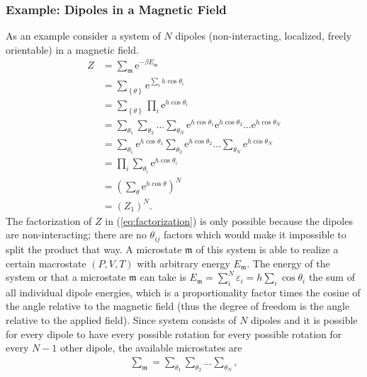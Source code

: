 \documentclass[a4paper,10pt]{article}
\numberwithin{equation}{section}
\begin{document}
\begin{multicols}{2}
\subsubsection{Example: Dipoles in a Magnetic Field}
As an example consider a system of $N$ dipoles (non-interacting, localized, freely orientable) in a magnetic field.
\begin{align} 
          Z &= \sum_{\mathfrak{m}}^{}\text{e}^{-\beta E_\mathfrak{m}}\\
            &= \sum_{ \left\{\theta \right\}}^{}\text{e}^{\sum_{i}^{}h\cos \theta _i}\\
            &= \sum_{ \left\{\theta \right\}}^{}\prod_{i}^{}\text{e}^{h\cos \theta _i}\\
            &= \sum_{\theta _1}^{}\sum_{\theta _2}^{}\hdots \sum_{\theta _N}^{}\text{e}^{h\cos \theta _1}\text{e}^{h\cos \theta _2}\hdots \text{e}^{h\cos \theta _N}\\
            &= \sum_{\theta _1}^{}\text{e}^{h\cos \theta _1}\sum_{\theta _2}^{}\text{e}^{h\cos \theta _2}\hdots \sum_{\theta _N}^{}\text{e}^{h\cos \theta _N} \label{eq:factorization}\\
            &= \prod_{i}^{}\sum_{\theta _i}^{}\text{e}^{h\cos \theta _i}\\
            &= \left(\sum_{\theta }^{}\text{e}^{h\cos \theta }\right)^N\\
            &= \left(Z_1\right)^N
.\end{align} 
The factorization of $Z$ in (\ref{eq:factorization}) is only possible because the dipoles are non-interacting; there are no $\theta _{ij}$ factors which would make it impossible to split the product that way.
A microstate $\mathfrak{m}$ of this system is able to realize a certain macrostate $\left(P,V,T\right)$ with arbitrary energy $E_\mathfrak{m}$.
The energy of the system or that a microstate $\mathfrak{m}$ can take is $E_\mathfrak{m}=\sum_{i}^{N}\varepsilon _i=h\sum_{i}^{}\cos \theta _i$ the sum of all individual dipole energies, which is a proportionality factor times the cosine of the angle relative to the magnetic field (thus the degree of freedom is the angle relative to the applied field).
Since system consists of $N$ dipoles and it is possible for every dipole to have every possible rotation for every possible rotation for every $N-1$ other dipole, the available microstates are
\begin{align} 
  \sum_{\mathfrak{m}}^{}=\sum_{\theta _1}^{}\sum_{\theta _2}^{}\hdots \sum_{\theta _N}^{}
,\end{align} 

\end{multicols}
\end{document}
